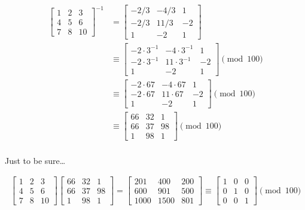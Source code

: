 \begin{Answer}
\begin{align*}
\begin{bmatrix}
1 & 2 & 3 \\
4 & 5 & 6 \\
7 & 8 & 10 
\end{bmatrix} ^{-1}
&= \begin{bmatrix}
  -2/3 & -4/3 & 1\\
  -2/3 & 11/3 & -2\\
  1 & -2 & 1 
\end{bmatrix}\\
&\equiv\begin{bmatrix}
  -2\cdot 3^{-1} & -4 \cdot 3^{-1} & 1\\
  -2\cdot 3^{-1} & 11\cdot 3^{-1} & -2\\
  1 & -2 & 1 
\end{bmatrix} \pmod{100}\\
&\equiv\begin{bmatrix}
  -2\cdot 67 & -4 \cdot 67 & 1\\
  -2\cdot 67 & 11\cdot 67 & -2\\
  1 & -2 & 1 
\end{bmatrix} \pmod{100} \\
&\equiv\begin{bmatrix}
  66 & 32 & 1\\
  66 & 37 & 98\\
  1 & 98 & 1 
\end{bmatrix} \pmod{100} \\
\end{align*}

\color{zaffre}
\noindent
Just to be sure\ldots

\begin{align*}
\begin{bmatrix}
  1 & 2 & 3 \\
  4 & 5 & 6 \\
  7 & 8 & 10 
\end{bmatrix}
\begin{bmatrix}
  66 & 32 & 1\\
  66 & 37 & 98\\
  1 & 98 & 1 
\end{bmatrix}
=
\begin{bmatrix}
  201 & 400 & 200\\
  600 & 901 & 500\\
  1000 & 1500 & 801 
\end{bmatrix}
\equiv
\begin{bmatrix}
  1 & 0 & 0\\
  0 & 1 & 0\\
  0 & 0 & 1 
\end{bmatrix} \pmod{100}
\end{align*}
\end{Answer}
